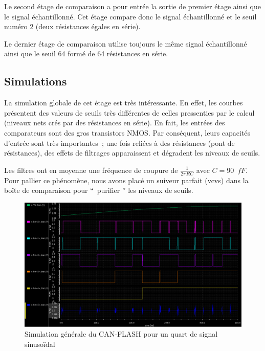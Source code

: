 \documentclass[11pt]{article}
\begin{document}
Le second \'etage de comparaison a pour entr\'ee la sortie de premier \'etage ainsi que le signal \'echantillonn\'e.
Cet \'etage compare donc le signal \'echantillonn\'e et le seuil num\'ero 2 (deux r\'esistances \'egales en s\'erie).

Le dernier \'etage de comparaison utilise toujours le m\^eme signal \'echantillonn\'e ainsi que le seuil 64 form\'e
de 64 r\'esistances en s\'erie.

\subsection{Simulations}

La simulation globale de cet \'etage est tr\`es int\'eressante. En effet, les courbes pr\'esentent des valeurs de
seuils tr\`es diff\'erentes de celles pressenties par le calcul (niveaux nets cr\'es par des r\'esistances en s\'erie).
En fait, les entr\'ees des comparateurs sont des gros transistors NMOS. Par cons\'equent, leurs capacit\'es d'entr\'ee
sont tr\`es importantes ; une fois reli\'ees \`a des r\'esistances (pont de r\'esistances), des effets de filtrages
apparaissent et d\'egradent les niveaux de seuils.

Les filtres ont en moyenne une fr\'equence de coupure de $\frac{1}{2 \pi R C}$ avec $C  = 90 \phantom{2} fF.$
Pour pallier ce ph\'enom\`ene, nous avons plac\'e un suiveur parfait (vcvs) dans la bo\^ite de comparaison pour
`` purifier '' les niveaux de seuils.

\begin{figure}[!htb]
      \centering
      \includegraphics[width=\linewidth]{sim_general.png}
      \caption{Simulation g\'en\'erale du CAN-FLASH pour un quart de signal sinuso\"idal}
      \label{fig:schsimgenerale}
\end{figure}%
\end{document}

